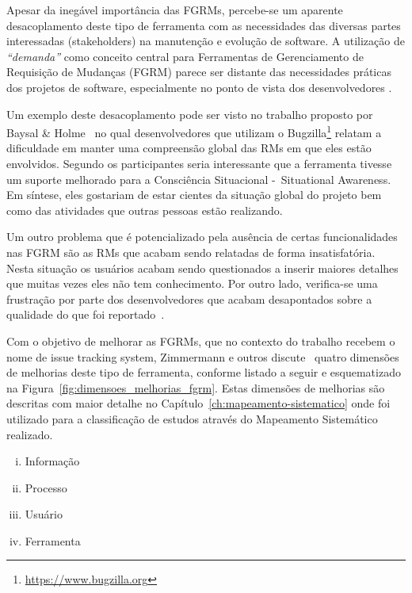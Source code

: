 Apesar da inegável importância das FGRMs, percebe-se um aparente desacoplamento
deste tipo de ferramenta com as necessidades das diversas partes interessadas
(stakeholders) na manutenção e evolução de software. A utilização de
\textit{``demanda''} como conceito central para Ferramentas de Gerenciamento de
Requisição de Mudanças (FGRM) parece ser distante das necessidades práticas dos
projetos de software, especialmente no ponto de vista dos desenvolvedores
\cite{Baysal:2013:SAP:2486788.2486957}.

Um exemplo deste desacoplamento pode ser visto no trabalho proposto por Baysal
\& Holme~\cite{baysal2012qualitative} no qual desenvolvedores que utilizam o
Bugzilla\footnote{\url{https://www.bugzilla.org}} relatam a dificuldade em
manter uma compreensão global das RMs em que eles estão envolvidos. Segundo os
participantes seria interessante que a ferramenta tivesse um suporte melhorado
para a Consciência Situacional -~Situational Awareness. Em síntese, eles
gostariam de estar cientes da situação global do projeto bem como das atividades
que outras pessoas estão realizando.

Um outro problema que é potencializado pela ausência de certas funcionalidades
nas FGRM são as RMs que acabam sendo relatadas de forma insatisfatória. Nesta
situação os usuários acabam sendo questionados a inserir maiores detalhes que
muitas vezes eles não tem conhecimento. Por outro lado, verifica-se uma
frustração por parte dos desenvolvedores que acabam desapontados sobre a
qualidade do que foi reportado~\cite{just2008towards}.

Com o objetivo de melhorar as FGRMs, que no contexto do trabalho recebem o nome
de issue tracking system, Zimmermann e outros
discute~\cite{zimmermann2009improving} quatro dimensões de melhorias deste tipo
de ferramenta, conforme listado a seguir e esquematizado na
Figura~\ref{fig:dimensoes_melhorias_fgrm}. Estas dimensões de melhorias são
descritas com maior detalhe no Capítulo~\ref{ch:mapeamento-sistematico} onde foi
utilizado para a classificação de estudos através do Mapeamento Sistemático
realizado.

\begin{enumerate} [(i)]
	\item{Informação}
	\item{Processo}
	\item{Usuário}
	\item{Ferramenta}
\end{enumerate}

